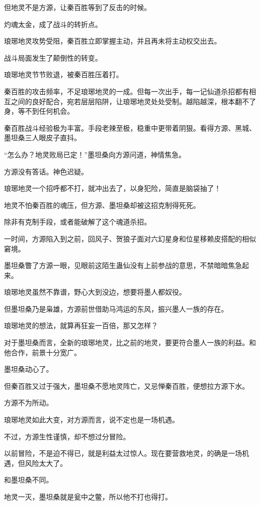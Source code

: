\begin{this_body}
但地灵不是方源，让秦百胜等到了反击的时候。

灼魂太金，成了战斗的转折点。

琅琊地灵攻势受阻，秦百胜立即掌握主动，并且再未将主动权交出去。

战斗局面发生了颠倒性的转变。

琅琊地灵节节败退，被秦百胜压着打。

秦百胜的攻击频率，不足琅琊地灵的一成。但每一次出手，每一记仙道杀招都有相互之间的良好配合，宛若层层陷阱，让琅琊地灵处处受制。越陷越深，根本翻不了身，等不到任何机会。

秦百胜战斗经验极为丰富。手段老辣至极，稳重中更带着阴狠。看得方源、黑城、墨坦桑三人眼皮子直抖。

“怎么办？地灵败局已定！”墨坦桑向方源问道，神情焦急。

方源没有答话。神色迟疑。

琅琊地灵一个招呼都不打，就冲出去了，以身犯险，简直是脑袋抽了！

地灵不怕秦百胜的魂压，但方源、墨坦桑却被这招克制得死死。

除非有克制手段，或者能破解了这个魂道杀招。

一时间，方源陷入到之前，回风子、贺狼子面对六幻星身和位星移赖皮搭配的相似窘境。

墨坦桑瞥了方源一眼，见眼前这陌生蛊仙没有上前参战的意思，不禁暗暗焦急起来。

琅琊地灵虽然不靠谱，野心大到没边，想要将墨人都奴役。

但墨坦桑乃是枭雄，方源前世借助马鸿运的东风，振兴墨人一族的存在。

琅琊地灵的想法，就算再狂妄一百倍，那又怎样？

对于墨坦桑而言，全新的琅琊地灵，比之前的地灵，要更符合墨人一族的利益。和他合作，前景十分宽广。

墨坦桑动心了。

但秦百胜又过于强大，墨坦桑不愿地灵阵亡，又忌惮秦百胜，便想拉方源下水。

方源不为所动。

琅琊地灵如此大变，对方源而言，说不定也是一场机遇。

不过，方源生性谨慎，却不想过分冒险。

以前冒险，不是迫不得已，就是利益太过惊人。现在要营救地灵，的确是一场机遇，但风险太大了。

和墨坦桑不同。

地灵一灭，墨坦桑就是瓮中之鳖，所以他不打也得打。


\end{this_body}
